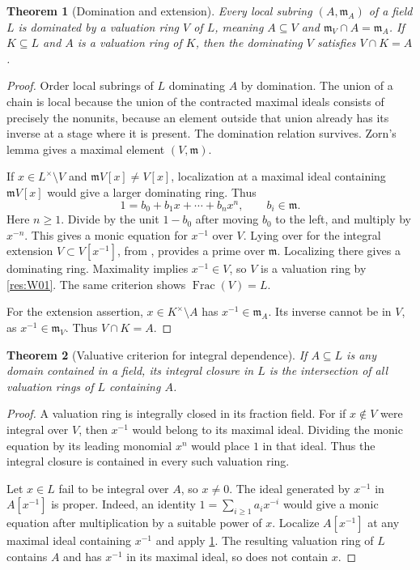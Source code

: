 \documentclass[11pt,oneside,openany]{book}
\newtheorem{theorem}{Theorem}[chapter]
\theoremstyle{definition}
\theoremstyle{remark}
\begin{document}
\begin{theorem}[Domination and extension]\label{res:W02}
Every local subring \((A,\mathfrak m_A)\) of a field \(L\) is dominated by a valuation ring \(V\) of \(L\), meaning \(A\subseteq V\) and \(\mathfrak m_V\cap A=\mathfrak m_A\). If \(K\subseteq L\) and \(A\) is a valuation ring of \(K\), then the dominating \(V\) satisfies \(V\cap K=A\).
\end{theorem}
\begin{proof}
Order local subrings of \(L\) dominating \(A\) by domination. The union of a chain is local because the union of the contracted maximal ideals consists of precisely the nonunits, because an element outside that union already has its inverse at a stage where it is present. The domination relation survives. Zorn's lemma gives a maximal element \((V,\mathfrak m)\).

If \(x\in L^\times\setminus V\) and \(\mathfrak m V[x]\ne V[x]\), localization at a maximal ideal containing \(\mathfrak m V[x]\) would give a larger dominating ring. Thus
\[
           1=b_0+b_1x+\cdots+b_nx^n,\qquad b_i\in\mathfrak m.
\]
Here \(n\ge1\). Divide by the unit \(1-b_0\) after moving \(b_0\) to the left, and multiply by \(x^{-n}\). This gives a monic equation for \(x^{-1}\) over \(V\). Lying over for the integral extension \(V\subset V[x^{-1}]\), from \cite[ALG-05-C01-R03]{p103}, provides a prime over \(\mathfrak m\). Localizing there gives a dominating ring. Maximality implies \(x^{-1}\in V\), so \(V\) is a valuation ring by \ref{res:W01}. The same criterion shows \(\operatorname{Frac}(V)=L\).

For the extension assertion, \(x\in K^\times\setminus A\) has \(x^{-1}\in\mathfrak m_A\). Its inverse cannot be in \(V\), as \(x^{-1}\in\mathfrak m_V\). Thus \(V\cap K=A\).
\end{proof}

\begin{theorem}[Valuative criterion for integral dependence]\label{res:W03}
If \(A\subseteq L\) is any domain contained in a field, its integral closure in \(L\) is the intersection of all valuation rings of \(L\) containing \(A\).
\end{theorem}
\begin{proof}
A valuation ring is integrally closed in its fraction field. For if \(x\notin V\) were integral over \(V\), then \(x^{-1}\) would belong to its maximal ideal. Dividing the monic equation by its leading monomial \(x^n\) would place \(1\) in that ideal. Thus the integral closure is contained in every such valuation ring.

Let \(x\in L\) fail to be integral over \(A\), so \(x\ne0\). The ideal generated by \(x^{-1}\) in \(A[x^{-1}]\) is proper. Indeed, an identity \(1=\sum_{i\ge1}a_i x^{-i}\) would give a monic equation after multiplication by a suitable power of \(x\). Localize \(A[x^{-1}]\) at any maximal ideal containing \(x^{-1}\) and apply \ref{res:W02}. The resulting valuation ring of \(L\) contains \(A\) and has \(x^{-1}\) in its maximal ideal, so does not contain \(x\).
\end{proof}
\end{document}
